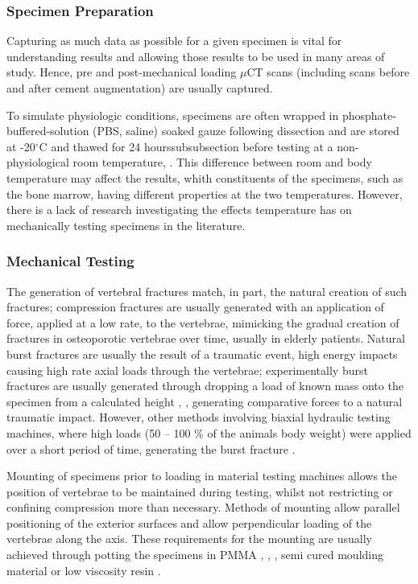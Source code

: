 \subsubsection{Specimen Preparation }\label{specimen-preparation}

Capturing as much data as possible for a given specimen is vital for understanding
results and allowing those results to be used in many areas of study.
Hence, pre and post-mechanical loading $\mu$CT scans (including
scans before and after cement augmentation) are usually captured.

To simulate physiologic conditions, specimens are often wrapped in
phosphate-buffered-solution (PBS, saline) soaked gauze following
dissection \cite{belkoff2002ex} and are stored at -20$^\circ$C and
thawed for 24
hourssubsubsection
before testing at a non-physiological room temperature\cite{tarsuslugil2013development},
\cite{furtado2007biomechanical}. This difference between room and body temperature may affect the results, whith constituents of the specimens, such as the bone marrow, having different properties at the two temperatures. However, there is a lack of research investigating the effects temperature has on mechanically testing specimens in the literature.
\subsubsection{Mechanical Testing }\label{mechanical-testing}

The generation of vertebral fractures match, in part, the natural
creation of such fractures; compression fractures are usually generated
with an application of force, applied at a low rate, to the vertebrae,
mimicking the gradual creation of fractures in osteoporotic vertebrae
over time, usually in elderly patients. Natural burst fractures are
usually the result of a traumatic event, high energy impacts causing high
rate axial loads through the vertebrae; experimentally burst fractures
are usually generated through dropping a load of known mass onto the
specimen from a calculated height \cite{tarsuslugil2013development},
\cite{wilcox2004dynamic},
generating
comparative forces to a natural traumatic impact. However, other methods
involving biaxial hydraulic testing machines, where high loads (50 --
100 \% of the animals body weight) were applied over a short period of
time, generating the burst fracture \cite{Gurwitz1993}.

Mounting of specimens prior to loading in material testing machines
allows the position of vertebrae to be maintained during testing, whilst
not restricting or confining compression more than necessary. Methods of
mounting allow parallel positioning of the exterior surfaces and allow
perpendicular loading of the vertebrae along the axis. These
requirements for the mounting are usually achieved through potting the
specimens in PMMA \cite{tarsuslugil2013development},
\cite{furtado2007biomechanical}, \cite{ananthakrishnan2005effect}, semi
cured moulding
material \cite{berlemann2002adjacent} or low viscosity resin
\cite{pneumaticos2013effect}.

